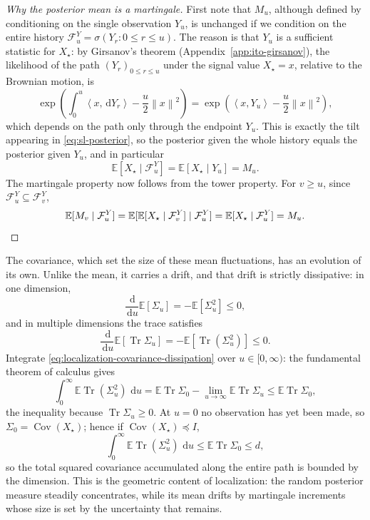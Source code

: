 \documentclass{amsart}
\numberwithin{equation}{section}
\theoremstyle{plain}
\theoremstyle{definition}
\theoremstyle{remark}
\DeclareMathOperator{\Cov}{Cov}
\DeclareMathOperator{\Tr}{Tr}
\newcommand{\E}{\mathbb{E}}
\newcommand{\dd}{\,\mathrm{d}}
\newcommand{\Id}{I}
\newcommand{\cF}{\mathcal{F}}
\newcommand{\norm}[1]{\left\lVert #1 \right\rVert}
\newcommand{\ip}[2]{\left\langle #1,#2 \right\rangle}
\begin{document}
\begin{proof}[Why the posterior mean is a martingale]
First note that $M_u$, although defined by conditioning on the single
observation $Y_u$, is unchanged if we condition on the entire history
$\cF_u^Y=\sigma(Y_r:0\leq r\leq u)$.  The reason is that $Y_u$ is a sufficient
statistic for $X_\star$: by Girsanov's theorem
(Appendix~\ref{app:ito-girsanov}), the likelihood of the path
$(Y_r)_{0\leq r\leq u}$ under the signal value $X_\star=x$, relative to the Brownian motion, is
\[
    \exp\!\left(\int_0^u\ip{x}{\dd Y_r}-\frac{u}{2}\norm{x}^2\right)
    =
    \exp\!\left(\ip{x}{Y_u}-\frac{u}{2}\norm{x}^2\right),
\]
which depends on the path only through the endpoint $Y_u$.  This is exactly the
tilt appearing in \eqref{eq:sl-posterior}, so the posterior given the whole
history equals the posterior given $Y_u$, and in particular
\[
    \E[X_\star\mid\cF_u^Y]=\E[X_\star\mid Y_u]=M_u.
\]
The martingale property now follows from the tower property.  For $v\geq u$,
since $\cF_u^Y\subseteq\cF_v^Y$,
\[
    \E[M_v\mid \cF_u^Y]
    =
    \E[\E[X_\star\mid \cF_v^Y]\mid \cF_u^Y]
    =
    \E[X_\star\mid \cF_u^Y]
    =
    M_u. \qedhere
\]
\end{proof}

The covariance, which set the size of these mean fluctuations, has an evolution
of its own.  Unlike the mean, it carries a drift, and that drift is strictly
dissipative: in one dimension,
\[
    \frac{\dd}{\dd u}\E[\Sigma_u]=-\E[\Sigma_u^2]\leq0,
\]
and in multiple dimensions the trace satisfies
\begin{equation}\label{eq:localization-covariance-dissipation}
    \frac{\dd}{\dd u}\E[\Tr\Sigma_u]
    =
    -\E[\Tr(\Sigma_u^2)]\leq0.
\end{equation}
Integrate \eqref{eq:localization-covariance-dissipation} over
$u\in[0,\infty)$: the fundamental theorem of calculus gives
\[
    \int_0^\infty\E\Tr(\Sigma_u^2)\,\dd u
    =
    \E\Tr\Sigma_0-\lim_{u\to\infty}\E\Tr\Sigma_u
    \leq
    \E\Tr\Sigma_0,
\]
the inequality because $\Tr\Sigma_u\geq0$.  At $u=0$ no observation has yet been
made, so $\Sigma_0=\Cov(X_\star)$; hence if $\Cov(X_\star)\preceq\Id$,
\begin{equation}\label{eq:localization-hessian-budget}
    \int_0^\infty
    \E\Tr(\Sigma_u^2)\,\dd u
    \leq
    \E\Tr\Sigma_0
    \leq d,
\end{equation}
so the total squared covariance accumulated along the entire path is bounded by
the dimension.  This is the geometric content of localization: the random
posterior measure steadily concentrates, while its mean drifts by martingale
increments whose size is set by the uncertainty that remains.
\end{document}
